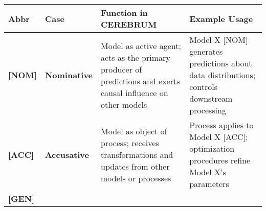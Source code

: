 \begin{longtable}[]{@{}llll@{}}
\toprule
\begin{minipage}[b]{0.11\columnwidth}\raggedright
Abbr\strut
\end{minipage} & \begin{minipage}[b]{0.11\columnwidth}\raggedright
Case\strut
\end{minipage} & \begin{minipage}[b]{0.40\columnwidth}\raggedright
Function in CEREBRUM\strut
\end{minipage} & \begin{minipage}[b]{0.27\columnwidth}\raggedright
Example Usage\strut
\end{minipage}\tabularnewline
\midrule
\endhead
\begin{minipage}[t]{0.11\columnwidth}\raggedright
\textbf{{[}NOM{]}}\strut
\end{minipage} & \begin{minipage}[t]{0.11\columnwidth}\raggedright
\textbf{Nominative}\strut
\end{minipage} & \begin{minipage}[t]{0.40\columnwidth}\raggedright
Model as active agent; acts as the primary producer of predictions and
exerts causal influence on other models\strut
\end{minipage} & \begin{minipage}[t]{0.27\columnwidth}\raggedright
Model X {[}NOM{]} generates predictions about data distributions;
controls downstream processing\strut
\end{minipage}\tabularnewline
\begin{minipage}[t]{0.11\columnwidth}\raggedright
\textbf{{[}ACC{]}}\strut
\end{minipage} & \begin{minipage}[t]{0.11\columnwidth}\raggedright
\textbf{Accusative}\strut
\end{minipage} & \begin{minipage}[t]{0.40\columnwidth}\raggedright
Model as object of process; receives transformations and updates from
other models or processes\strut
\end{minipage} & \begin{minipage}[t]{0.27\columnwidth}\raggedright
Process applies to Model X {[}ACC{]}; optimization procedures refine
Model X's parameters\strut
\end{minipage}\tabularnewline
\begin{minipage}[t]{0.11\columnwidth}\raggedright
\textbf{{[}GEN{]}}\strut

\end{minipage}
\end{longtable}
